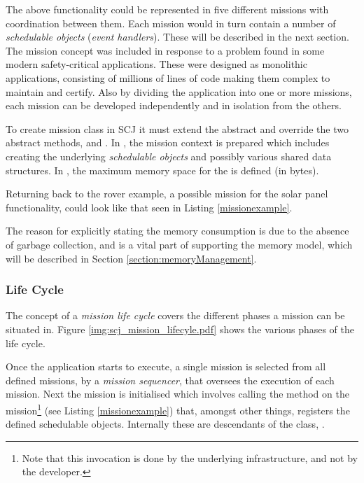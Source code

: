 The above functionality could be represented in five different missions with coordination between them. Each mission would in turn contain a number of \textit{schedulable objects} (\textit{event handlers}). These will be described in the next section. The mission concept was included in response to a problem found in some modern safety-critical applications. These were designed as monolithic applications, consisting of millions of lines of code making them complex to maintain and certify. Also by dividing the application into one or more missions, each mission can be developed independently and in isolation from the others.  

To create mission class in SCJ it must extend the abstract  and override the two abstract methods,  and . In , the mission context is prepared which includes creating the underlying \textit{schedulable objects} and possibly various shared data structures. In , the maximum memory space for the  is defined (in bytes).

Returning back to the rover example, a possible mission for the solar panel functionality, could look like that seen in Listing \ref{missionexample}.



The reason for explicitly stating the memory consumption is due to the absence of garbage collection, and is a vital part of supporting the memory model, which will be described in Section \ref{section:memoryManagement}.

\subsubsection{Life Cycle}
\label{subsec:lifecycle}
The concept of a \textit{mission life cycle} covers the different phases a mission can be situated in. Figure \ref{img:scj_mission_lifecyle.pdf} shows the various phases of the life cycle.


Once the application starts to execute, a single mission is selected from all defined missions, by a \textit{mission sequencer}, that oversees the execution of each mission. Next the mission is initialised which involves calling the  method on the mission\footnote{Note that this invocation is done by the underlying infrastructure, and not by the developer.} (see Listing \ref{missionexample}) that, amongst other things, registers the defined schedulable objects. Internally these are descendants of the class, . 

